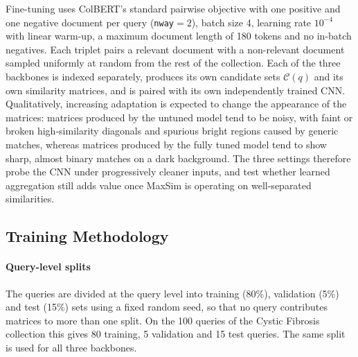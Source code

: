 \documentclass[preprint,5p,times,twocolumn,authoryear]{elsarticle}
\begin{document}
Fine-tuning uses ColBERT's standard pairwise objective with one positive and one negative document per query (\texttt{nway}$=2$), batch size 4, learning rate $10^{-4}$ with linear warm-up, a maximum document length of 180 tokens and no in-batch negatives. Each triplet pairs a relevant document with a non-relevant document sampled uniformly at random from the rest of the collection.
Each of the three backbones is indexed separately, produces its own candidate sets $\mathcal{C}(q)$ and its own similarity matrices, and is paired with its own independently trained CNN. Qualitatively, increasing adaptation is expected to change the appearance of the matrices: matrices produced by the untuned model tend to be noisy, with faint or broken high-similarity diagonals and spurious bright regions caused by generic matches, whereas matrices produced by the fully tuned model tend to show sharp, almost binary matches on a dark background. The three settings therefore probe the CNN under progressively cleaner inputs, and test whether learned aggregation still adds value once MaxSim is operating on well-separated similarities.

\subsection{Training Methodology}
\label{sec:training}

\paragraph{Query-level splits}
The queries are divided at the query level into training (80\%), validation (5\%) and test (15\%) sets using a fixed random seed, so that no query contributes matrices to more than one split. On the 100 queries of the Cystic Fibrosis collection this gives 80 training, 5 validation and 15 test queries. The same split is used for all three backbones.
\end{document}
